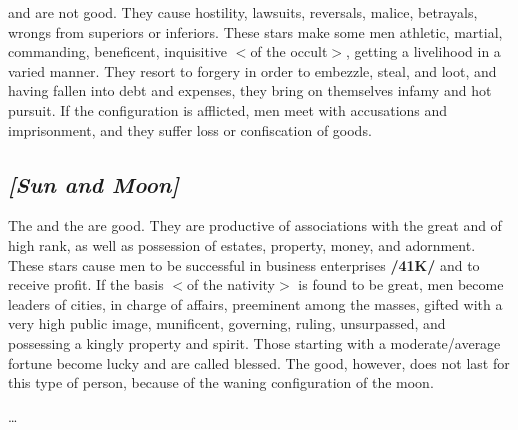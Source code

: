 \Mercury\xspace and \Mars\xspace are not good. They cause hostility, lawsuits, reversals, malice, betrayals, wrongs
from superiors or inferiors. These stars make some men athletic, martial, commanding, beneficent, inquisitive $<$of the occult$>$, getting a livelihood in a varied manner. They resort to forgery in order to embezzle, steal, and loot, and having fallen into debt and expenses, they bring on themselves infamy and hot pursuit. If the configuration is afflicted, men meet with accusations and imprisonment, and they suffer
loss or confiscation of goods.

\secbr
\subsection{\textit{[Sun and Moon]}}
The \Sun\xspace and the \Moon\xspace are good. They are productive of associations with the great and of high rank,
as well as possession of estates, property, money, and adornment. These stars cause men to be successful in business enterprises \textbf{/41K/} and to receive profit. If the basis $<$of the nativity$>$ is found to be great, men become leaders of cities, in charge of affairs, preeminent among the masses, gifted with a very high public image, munificent, governing, ruling, unsurpassed, and possessing a kingly property and spirit. Those starting with a moderate/average fortune become lucky and are called blessed. The good, however, does not last for this type of person, because of the waning configuration of the moon. 

\ldots


\newpage